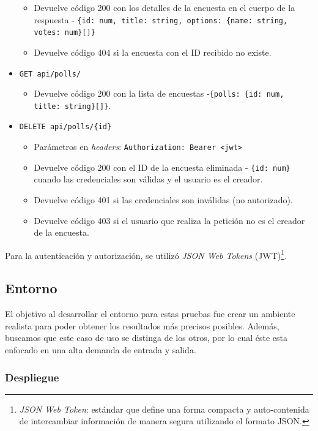 \documentclass[11pt]{article}
\let\Oldsubsection\subsection
\renewcommand{\subsection}{\FloatBarrier\Oldsubsection}
\let\Oldsubsubsection\subsubsection
\renewcommand{\subsubsection}{\FloatBarrier\Oldsubsubsection}
\newcommand{\english}[1]{\textit{#1}}
\begin{document}
\begin{itemize}
    \begin{itemize}
        \item Devuelve código 200 con los detalles de la encuesta en el cuerpo de la respuesta - \lstinline|{id: num, title: string, options: {name: string, votes: num}[]}|
        \item Devuelve código 404 si la encuesta con el ID recibido no existe.
    \end{itemize}
    \item \lstinline|GET api/polls/|
    \begin{itemize}
        \item Devuelve código 200 con la lista de encuestas -\enspace\lstinline|{polls: {id: num, title: string}[]}|.
    \end{itemize}
    \item \lstinline|DELETE api/polls/{id}|
    \begin{itemize}
        \item Parámetros en \english{headers}: \lstinline|Authorization: Bearer <jwt>|
        \item Devuelve código 200 con el ID de la encuesta eliminada - \lstinline|{id: num}| cuando las credenciales son válidas y el usuario es el creador.
        \item Devuelve código 401 si las credenciales son inválidas (no autorizado).
        \item Devuelve código 403 si el usuario que realiza la petición no es el creador de la encuesta.
    \end{itemize}
\end{itemize}

Para la autenticación y autorización, se utilizó \english{JSON Web Tokens} (JWT)\footnote{\english{JSON Web Token}: estándar que define una forma compacta y auto-contenida de intercambiar información de manera segura utilizando el formato JSON.}.


\subsection{Entorno}

El objetivo al desarrollar el entorno para estas pruebas fue crear un ambiente realista para poder obtener los resultados más precisos posibles. Además, buscamos que este caso de uso se distinga de los otros, por lo cual éste esta enfocado en una alta demanda de entrada y salida.

\subsubsection{Despliegue}
\end{document}

